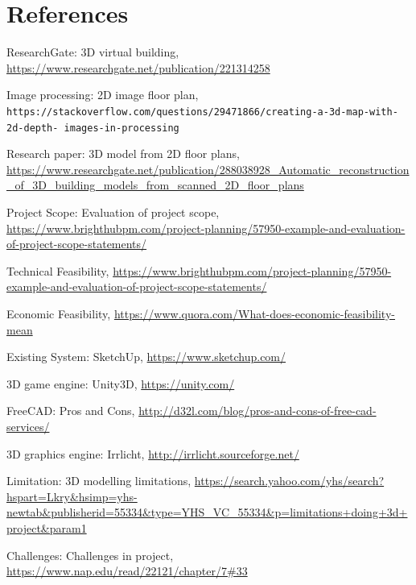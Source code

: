 \documentclass{article}
\begin{document}
\pagebreak
\section{References}
\begin{thebibliography}{9}

ResearchGate: 3D virtual building,
\url{https://www.researchgate.net/publication/221314258}

 
Image processing: 2D image floor plan,
\\\texttt{https://stackoverflow.com/questions/29471866/creating-a-3d-map-with-2d-depth-
images-in-processing}

Research paper: 3D model from 2D floor plans,
\url{https://www.researchgate.net/publication/288038928_Automatic_reconstruction_of_3D_building_models_from_scanned_2D_floor_plans}

Project Scope: Evaluation of project scope,
\url{https://www.brighthubpm.com/project-planning/57950-example-and-evaluation-of-project-scope-statements/}

Technical Feasibility,
\url{https://www.brighthubpm.com/project-planning/57950-example-and-evaluation-of-project-scope-statements/}

Economic Feasibility,
\url{https://www.quora.com/What-does-economic-feasibility-mean}

Existing System: SketchUp,
\url{https://www.sketchup.com/}

3D game engine: Unity3D,
\url{https://unity.com/}


FreeCAD: Pros and Cons,
\url{http://d32l.com/blog/pros-and-cons-of-free-cad-services/}

3D graphics engine: Irrlicht,
\url{http://irrlicht.sourceforge.net/}

Limitation: 3D modelling limitations,
\url{https://search.yahoo.com/yhs/search?hspart=Lkry&hsimp=yhs-newtab&publisherid=55334&type=YHS_VC_55334&p=limitations+doing+3d+project&param1}

Challenges: Challenges in project,
\url{https://www.nap.edu/read/22121/chapter/7#33}
\end{thebibliography}
\end{document}
